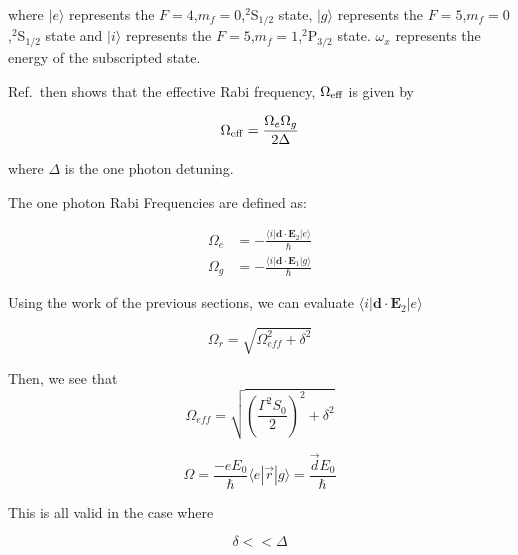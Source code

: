 where $|e\rangle$ represents the $F=4$,$m_f=0$,$^2$S$_{1/2}$ state, $|g\rangle$ represents the $F=5$,$m_f=0$,$^2$S$_{1/2}$ state and $|i\rangle$ represents the $F=5$,$m_f=1$,$^2$P$_{3/2}$ state. $\omega_x$ represents the energy of the subscripted state.

Ref.\,\cite{Young1997363} then shows that the effective Rabi frequency, $\Omega_{\textnormal{eff}}$ is given by 

\begin{equation}
\Omega_{\rm eff}=\frac{\Omega_{e} \Omega_{g}}{2 \Delta}
\end{equation}

where $\Delta$ is the one photon detuning. %

The one photon Rabi Frequencies are defined as:

\begin{align}
\Omega_e&=-\frac{\langle i | \mathbf{d}\cdot \mathbf{E}_2 | e\rangle }{\hbar}\\
\Omega_g&=-\frac{\langle i | \mathbf{d}\cdot \mathbf{E}_1 | g\rangle}{\hbar}
\end{align}

Using the work of the previous sections, we can evaluate $\langle i | \mathbf{d}\cdot \mathbf{E}_2 | e\rangle$

\begin{equation}
\Omega_\mathit{r}=\sqrt{\Omega_\mathit{eff}^2+\delta^2}
\end{equation}

Then, we see that 
\begin{equation}
\Omega_\mathit{eff}=\sqrt{\left(\frac{\Gamma^2S_0}{2}\right)^2 + \delta^2}
\end{equation}

\begin{equation}
\Omega = \frac{-eE_0}{\hbar}\langle e |\vec{r}|g\rangle=\frac{\vec{d}E_0}{\hbar}
\end{equation}

This is all valid in the case where 

\begin{equation}
\delta<<\Delta
\end{equation}

%
%


